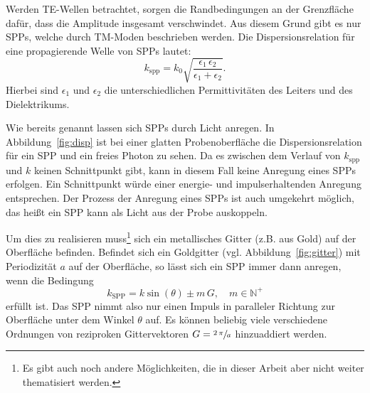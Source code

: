 Werden TE-Wellen betrachtet, sorgen die Randbedingungen an der Grenzfläche
dafür, dass die Amplitude insgesamt verschwindet.\cite{plasmonics} 
Aus diesem Grund gibt es nur SPPs, welche durch TM-Moden beschrieben werden. 
Die Dispersionsrelation für eine propagierende Welle von SPPs lautet\cite{plasmonics}:
\begin{equation}
    k_\text{spp} = k_0 \sqrt{\frac{\epsilon_1 \,\epsilon_2}{\epsilon_1 + \epsilon_2}}.
    \label{eq:disp}
\end{equation}
Hierbei sind $\epsilon_1$ und $\epsilon_2$ die unterschiedlichen Permittivitäten des Leiters und
des Dielektrikums.

Wie bereits genannt lassen sich SPPs durch Licht anregen.
In Abbildung~\ref{fig:disp} ist bei einer glatten Probenoberfläche die Dispersionsrelation für 
ein SPP und ein freies Photon zu sehen. 
Da es zwischen dem Verlauf von $k_\text{spp}$ und $k$ keinen Schnittpunkt gibt, kann
in diesem Fall keine Anregung eines SPPs erfolgen. 
Ein Schnittpunkt würde einer energie- und impulserhaltenden Anregung entsprechen.
Der Prozess der Anregung eines SPPs ist auch umgekehrt möglich, das heißt ein SPP kann als Licht aus der Probe auskoppeln.

Um dies zu realisieren muss\footnote{Es gibt auch noch andere Möglichkeiten,
die in dieser Arbeit aber nicht weiter thematisiert werden.} sich ein metallisches Gitter 
(z.B. aus Gold) auf der Oberfläche befinden.
Befindet sich ein Goldgitter (vgl. Abbildung~\ref{fig:gitter}) 
mit Periodizität $a$ auf der Oberfläche, so lässt sich 
ein SPP immer dann anregen, wenn die Bedingung
\begin{equation}
    k_\text{SPP} = k \sin(\theta) \pm m \, G, \quad  m \in \mathbb{N}^+
\end{equation}
erfüllt ist.\cite{plasmonics}
Das SPP nimmt also nur einen Impuls in paralleler Richtung zur Oberfläche unter dem Winkel $\theta$ auf.
Es können beliebig viele verschiedene Ordnungen von
reziproken Gittervektoren $G = \sfrac{2 \, \pi}{a}$ hinzuaddiert werden.

